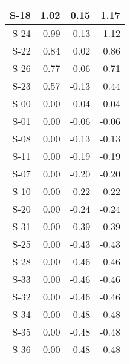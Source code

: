 \begin{tabular}{ | r | r | r | r | }
    \hline
                  S-18  &            1.02  &            0.15  &            1.17  \\
    \hline
                  S-24  &            0.99  &            0.13  &            1.12  \\
    \hline
                  S-22  &            0.84  &            0.02  &            0.86  \\
    \hline
                  S-26  &            0.77  &           -0.06  &            0.71  \\
    \hline
                  S-23  &            0.57  &           -0.13  &            0.44  \\
    \hline
                  S-00  &            0.00  &           -0.04  &           -0.04  \\
    \hline
                  S-01  &            0.00  &           -0.06  &           -0.06  \\
    \hline
                  S-08  &            0.00  &           -0.13  &           -0.13  \\
    \hline
                  S-11  &            0.00  &           -0.19  &           -0.19  \\
    \hline
                  S-07  &            0.00  &           -0.20  &           -0.20  \\
    \hline
                  S-10  &            0.00  &           -0.22  &           -0.22  \\
    \hline
                  S-20  &            0.00  &           -0.24  &           -0.24  \\
    \hline
                  S-31  &            0.00  &           -0.39  &           -0.39  \\
    \hline
                  S-25  &            0.00  &           -0.43  &           -0.43  \\
    \hline
                  S-28  &            0.00  &           -0.46  &           -0.46  \\
    \hline
                  S-33  &            0.00  &           -0.46  &           -0.46  \\
    \hline
                  S-32  &            0.00  &           -0.46  &           -0.46  \\
    \hline
                  S-34  &            0.00  &           -0.48  &           -0.48  \\
    \hline
                  S-35  &            0.00  &           -0.48  &           -0.48  \\
    \hline
                  S-36  &            0.00  &           -0.48  &           -0.48  \\

\end{tabular}
